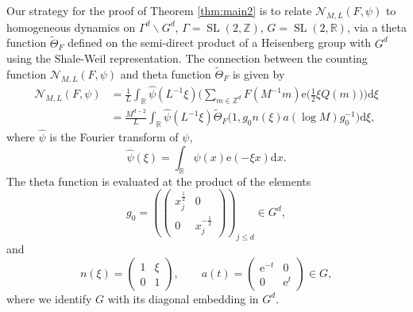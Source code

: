 \documentclass[12pt]{amsart}
\theoremstyle{definition}
\theoremstyle{remark}
\numberwithin{equation}{section}
\newcommand{\dd}{\mathrm{d}}
\newcommand{\R}{\mathbb{R}}
\newcommand{\Z}{\mathbb{Z}}
\newcommand{\e}{\mathrm{e}}
\newcommand{\cN}{\mathcal{N}}
\newcommand{\SL}{\operatorname{SL}}
\begin{document}
Our strategy for the proof of Theorem \ref{thm:main2} is to relate $\cN_{M,L}(F,\psi)$ to homogeneous dynamics on $\Gamma^d \backslash G^d$, $\Gamma = \SL(2, \Z)$, $G = \SL(2, \R)$, via a theta function $\widetilde\Theta_F$ defined on the semi-direct product of a Heisenberg group with $G^d$ using the Shale-Weil representation. The connection between the counting function $\cN_{M,L}(F,\psi)$ and theta function $\widetilde\Theta_F$ is given by
\begin{equation}
  \label{eq:FourierRLM}
  \begin{split}
\cN_{M,L}(F,\psi) 
& = \frac{1}{L} \int_{\mathbb{R}} \hat{\psi}( L^{-1}\xi)  \bigg(\sum_{m \in \mathbb{Z}^d} F(M^{-1} m) \e\big( \tfrac{1}{2} \xi Q(m) \big) \bigg)  \dd \xi \\
&  =  \frac{M^{d-2}}{L} \int_{\mathbb{R}} \hat{\psi} ( L^{-1}\xi ) \widetilde\Theta_F\big(1, g_0 n(\xi) a(\log M) g_0^{-1}\big)  \dd \xi,
\end{split}
\end{equation}
where $\hat{\psi}$ is the Fourier transform of $\psi$,
\begin{equation}
  \label{eq:psihatdef}
  \hat{\psi}(\xi) = \int_{\mathbb{R}} \psi(x) \e(- \xi x) \dd x .
\end{equation}
The theta function is evaluated at the product of the elements
\begin{equation}
  \label{eq:g0andef}
  g_0 = \left(
  \begin{pmatrix}
    x_j^{\frac{1}{2}} & 0 \\
    0 & x_j^{-\frac{1}{2}}
  \end{pmatrix} 
    \right)_{\!\! j\leq d} \in G^d,
\end{equation}
and
\begin{equation}
  \label{eq:nadef}
  n(\xi) =
  \begin{pmatrix}
    1 & \xi \\
    0 & 1
  \end{pmatrix}
  ,
  \qquad 
   a(t) =
  \begin{pmatrix}
    \e^{-t}& 0 \\
    0 & \e^{t}
  \end{pmatrix}
  \in G,
\end{equation}
where we identify $G$ with its diagonal embedding in $G^d$.
\end{document}
